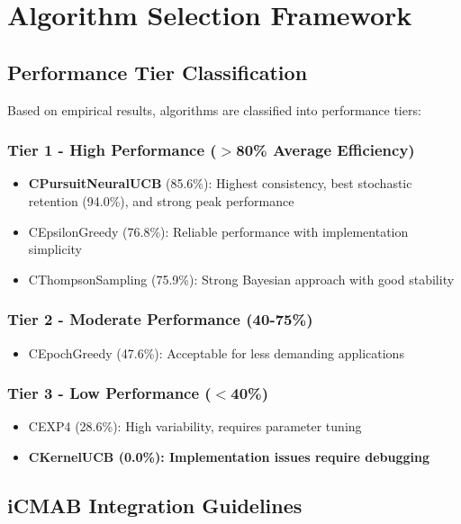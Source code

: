 \documentclass[12pt,a4paper]{article}
\newcommand{\primarytext}[1]{\textcolor{primaryblue}{\textbf{#1}}}
\newcommand{\warning}[1]{\textcolor{warningred}{\textbf{#1}}}
\begin{document}
\section{Algorithm Selection Framework}

\subsection{Performance Tier Classification}

Based on empirical results, algorithms are classified into performance tiers:

\subsubsection{Tier 1 - High Performance ($>$80\% Average Efficiency)}
\begin{itemize}
\item \primarytext{CPursuitNeuralUCB} (85.6\%): Highest consistency, best stochastic retention (94.0\%), and strong peak performance
\item CEpsilonGreedy (76.8\%): Reliable performance with implementation simplicity
\item CThompsonSampling (75.9\%): Strong Bayesian approach with good stability
\end{itemize}

\subsubsection{Tier 2 - Moderate Performance (40-75\%)}
\begin{itemize}
\item CEpochGreedy (47.6\%): Acceptable for less demanding applications
\end{itemize}

\subsubsection{Tier 3 - Low Performance ($<$40\%)}
\begin{itemize}
\item CEXP4 (28.6\%): High variability, requires parameter tuning
\item \warning{CKernelUCB (0.0\%): Implementation issues require debugging}
\end{itemize}

\subsection{iCMAB Integration Guidelines}
\end{document}
